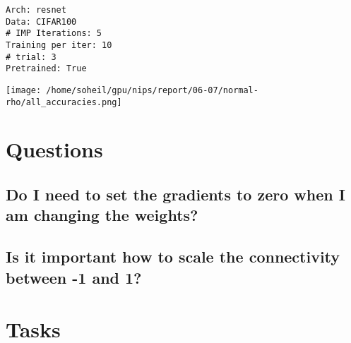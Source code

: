 \documentclass[a4paper]{article}
\begin{document}
\begin{verbatim}
Arch: resnet
Data: CIFAR100
# IMP Iterations: 5
Training per iter: 10
# trial: 3
Pretrained: True
\end{verbatim}

\begin{center}
\texttt{[image: /home/soheil/gpu/nips/report/06-07/normal-rho/all\_accuracies.png]}
\label{orgf277e0b}
\end{center}
\section{Questions}
\label{sec:org5675300}
\subsection{Do I need to set the gradients to zero when I am changing the weights?}
\label{sec:org7d122de}
\subsection{Is it important how to scale the connectivity between -1 and 1?}
\label{sec:org51c5d98}
\section{Tasks}
\label{sec:orgeb01535}
\end{document}
